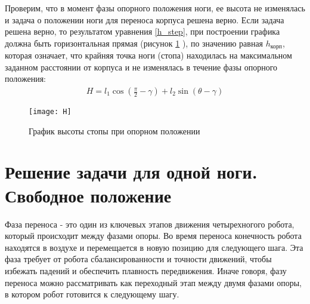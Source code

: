 \newpage 
Проверим, что в момент фазы опорного положения ноги, ее высота не изменялась и задача о положении ноги для переноса корпуса решена верно. Если задача решена верно, то результатом уравнения \ref{h_step}, при построении графика должна быть горизонтальная прямая (рисунок \ref{H} ), по значению равная $h_{\text{корп}}$, которая означает, что крайняя точка ноги (стопа) находилась на максимальном заданном расстоянии от корпуса и не изменялась в течение фазы опорного положения:
\begin{equation}
	\begin{array}{l}
		H = l_{1}\cos({\frac{\pi}{2}-\gamma}) + l_{2}\sin({\theta-\gamma})
	\end{array}
	\label{h_step}
\end{equation}
\newline
\begin{figure}[h!]
	\begin{center}
		\texttt{[image: H]}
		\caption{График высоты стопы при опорном положении}
		\label{H}
	\end{center}
\end{figure}
\newpage
\section{Решение задачи для одной ноги. Свободное положение}\label{C3_3}
Фаза переноса - это один из ключевых этапов движения четырехногого робота, который происходит между фазами опоры. Во время переноса конечность робота находятся в воздухе и перемещается в новую позицию для следующего шага. Эта фаза требует от робота сбалансированности и точности движений, чтобы избежать падений и обеспечить плавность передвижения. Иначе говоря, фазу переноса можно рассматривать как переходный этап между двумя фазами опоры, в котором робот готовится к следующему шагу.

